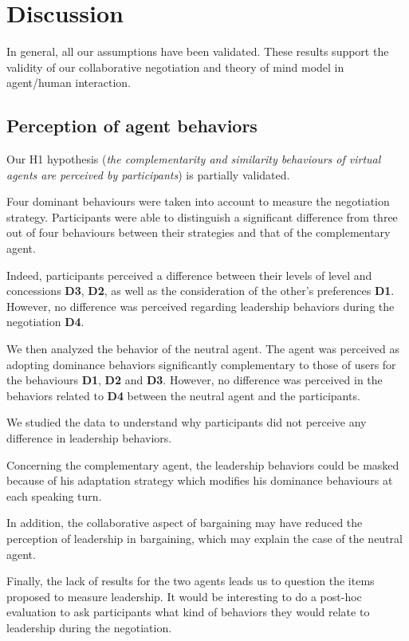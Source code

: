 \documentclass[10pt, a4paper]{article} %
\begin{document}
\section{Discussion}
\label{sec:discussion}
In general, all our assumptions have been validated. These results support the validity of our collaborative negotiation and theory of mind model in agent/human interaction.   

\subsection{Perception of agent behaviors}
Our H1 hypothesis (\textit{the complementarity and similarity behaviours of virtual agents are perceived by participants}) is partially validated. 

Four dominant behaviours were taken into account to measure the negotiation strategy. 
Participants were able to distinguish a significant difference from three out of four behaviours between their strategies and that of the complementary agent.

Indeed, participants perceived a difference between their levels of level and concessions \textbf{D3}, \textbf{D2}, as well as the consideration of the other's preferences \textbf{D1}. However, no difference was perceived regarding leadership behaviors during the negotiation \textbf{D4}. 

We then analyzed the behavior of the neutral agent. The agent was perceived as adopting dominance behaviors significantly complementary to those of users for the behaviours \textbf{D1}, \textbf{D2} and \textbf{D3}. 
However, no difference was perceived in the behaviors related to \textbf{D4} between the neutral agent and the participants. 

We studied the data to understand why participants did not perceive any difference in leadership behaviors. 

Concerning the complementary agent, the leadership behaviors could be masked because of his adaptation strategy which modifies his dominance behaviours at each speaking turn.

In addition, the collaborative aspect of bargaining may have reduced the perception of leadership in bargaining, which may explain the case of the neutral agent. 

Finally, the lack of results for the two agents leads us to question the items proposed to measure leadership. 
It would be interesting to do a post-hoc evaluation to ask participants what kind of behaviors they would relate to leadership during the negotiation.
\end{document}
